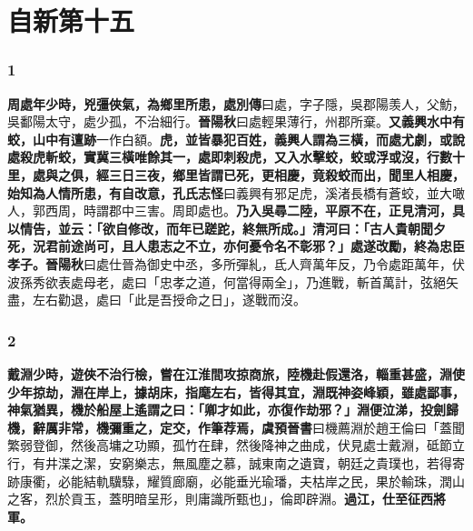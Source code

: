 \chapter{自新第十五}

\subsection*{1}

\textbf{周處年少時，兇彊俠氣，為鄉里所患，}{\footnotesize \textbf{處別傳}曰處，字子隱，吳郡陽羡人，父魴，吳鄱陽太守，處少孤，不治細行。\textbf{晉陽秋}曰處輕果薄行，州郡所棄。}\textbf{又義興水中有蛟，山中有邅跡}{\footnotesize 一作白額。}\textbf{虎，並皆暴犯百姓，義興人謂為三橫，而處尤劇，或說處殺虎斬蛟，實冀三橫唯餘其一，處即刺殺虎，又入水擊蛟，蛟或浮或沒，行數十里，處與之俱，經三日三夜，鄉里皆謂已死，更相慶，竟殺蛟而出，聞里人相慶，始知為人情所患，有自改意，}{\footnotesize \textbf{孔氏志怪}曰義興有邪足虎，溪渚長橋有蒼蛟，並大噉人，郭西周，時謂郡中三害。周即處也。}\textbf{乃入吳尋二陸，平原不在，正見清河，具以情告，並云：「欲自修改，而年已蹉跎，終無所成。」清河曰：「古人貴朝聞夕死，況君前途尚可，且人患志之不立，亦何憂令名不彰邪？」處遂改勵，終為忠臣孝子。}{\footnotesize \textbf{晉陽秋}曰處仕晉為御史中丞，多所彈糺，氐人齊萬年反，乃令處距萬年，伏波孫秀欲表處母老，處曰「忠孝之道，何當得兩全」，乃進戰，斬首萬計，弦絕矢盡，左右勸退，處曰「此是吾授命之日」，遂戰而沒。}

\subsection*{2}

\textbf{戴淵少時，遊俠不治行檢，嘗在江淮間攻掠商旅，陸機赴假還洛，輜重甚盛，淵使少年掠劫，淵在岸上，據胡床，指麾左右，皆得其宜，淵既神姿峰穎，雖處鄙事，神氣猶異，機於船屋上遙謂之曰：「卿才如此，亦復作劫邪？」淵便泣涕，投劍歸機，辭厲非常，機彌重之，定交，作筆荐焉，}{\footnotesize \textbf{虞預晉書}曰機薦淵於趙王倫曰「蓋聞繁弱登御，然後高墉之功顯，孤竹在肆，然後降神之曲成，伏見處士戴淵，砥節立行，有井渫之潔，安窮樂志，無風塵之慕，誠東南之遺寶，朝廷之貴璞也，若得寄跡康衢，必能結軌驥騄，耀質廊廟，必能垂光瑜璠，夫枯岸之民，果於輸珠，潤山之客，烈於貢玉，蓋明暗呈形，則庸識所甄也」，倫即辟淵。}\textbf{過江，仕至征西將軍。}
